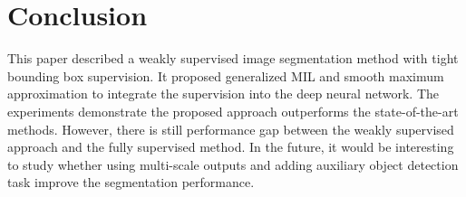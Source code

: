 \documentclass[runningheads]{llncs}
\begin{document}
\section{Conclusion}
This paper described a weakly supervised image segmentation method with tight bounding box supervision. It proposed generalized MIL and smooth maximum approximation to integrate the supervision into the deep neural network. The experiments demonstrate the proposed approach outperforms the state-of-the-art methods. However, there is still performance gap between the weakly supervised approach and the fully supervised method. In the future, it would be interesting to study whether using multi-scale outputs and adding auxiliary object detection task improve the segmentation performance. 









\end{document}
